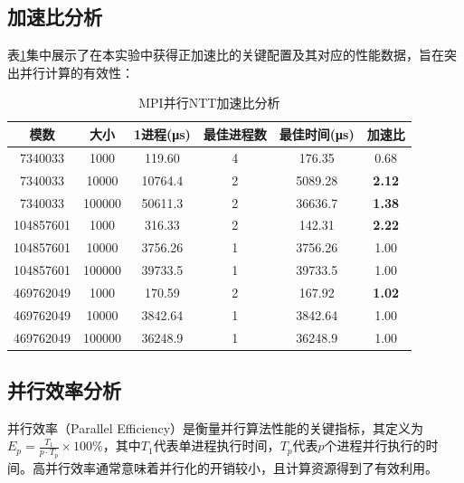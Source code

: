 \documentclass[a4paper]{article}
\begin{document}
\subsection{加速比分析}

表\ref{table:speedup_analysis}集中展示了在本实验中获得正加速比的关键配置及其对应的性能数据，旨在突出并行计算的有效性：

\begin{table}[!htbp]
  \centering
  \begin{tabular}{|c|c|c|c|c|c|}
  \hline
  \textbf{模数} & \textbf{大小} & \textbf{1进程(μs)} & \textbf{最佳进程数} & \textbf{最佳时间(μs)} & \textbf{加速比} \\
  \hline
  7340033 & 1000 & 119.60 & 4 & 176.35 & 0.68 \\
  7340033 & 10000 & 10764.4 & 2 & 5089.28 & \textbf{2.12} \\
  7340033 & 100000 & 50611.3 & 2 & 36636.7 & \textbf{1.38} \\
  \hline
  104857601 & 1000 & 316.33 & 2 & 142.31 & \textbf{2.22} \\
  104857601 & 10000 & 3756.26 & 1 & 3756.26 & 1.00 \\
  104857601 & 100000 & 39733.5 & 1 & 39733.5 & 1.00 \\
  \hline
  469762049 & 1000 & 170.59 & 2 & 167.92 & \textbf{1.02} \\
  469762049 & 10000 & 3842.64 & 1 & 3842.64 & 1.00 \\
  469762049 & 100000 & 36248.9 & 1 & 36248.9 & 1.00 \\
  \hline
  \end{tabular}
  \caption{MPI并行NTT加速比分析}
  \label{table:speedup_analysis}
\end{table}

\subsection{并行效率分析}

并行效率（Parallel Efficiency）是衡量并行算法性能的关键指标，其定义为$E_p = \frac{T_1}{p \cdot T_p} \times 100\%$，其中$T_1$代表单进程执行时间，$T_p$代表$p$个进程并行执行的时间。高并行效率通常意味着并行化的开销较小，且计算资源得到了有效利用。
\end{document}
